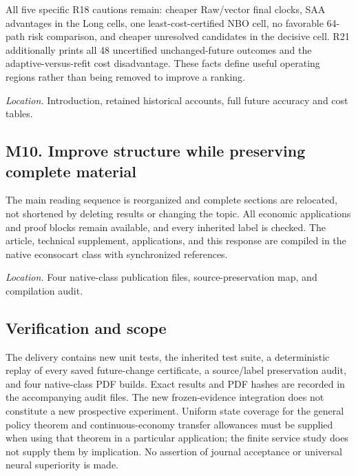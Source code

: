 \documentclass[ecta,nameyear,draft]{econsocart}
\theoremstyle{definition}
\theoremstyle{remark}
\begin{document}
All five specific R18 cautions remain: cheaper Raw/vector final clocks, SAA advantages in the Long cells, one least-cost-certified NBO cell, no favorable 64-path risk comparison, and cheaper unresolved candidates in the decisive cell. R21 additionally prints all 48 uncertified unchanged-future outcomes and the adaptive-versus-refit cost disadvantage. These facts define useful operating regions rather than being removed to improve a ranking.


\par\smallskip\noindent\emph{Location.} Introduction, retained historical accounts, full future accuracy and cost tables.

\subsection*{M10. Improve structure while preserving complete material}

The main reading sequence is reorganized and complete sections are relocated, not shortened by deleting results or changing the topic. All economic applications and proof blocks remain available, and every inherited label is checked. The article, technical supplement, applications, and this response are compiled in the native econsocart class with synchronized references.


\par\smallskip\noindent\emph{Location.} Four native-class publication files, source-preservation map, and compilation audit.

\subsection*{Verification and scope}

The delivery contains new unit tests, the inherited test suite, a deterministic replay of every saved future-change certificate, a source/label preservation audit, and four native-class PDF builds. Exact results and PDF hashes are recorded in the accompanying audit files. The new frozen-evidence integration does not constitute a new prospective experiment. Uniform state coverage for the general policy theorem and continuous-economy transfer allowances must be supplied when using that theorem in a particular application; the finite service study does not supply them by implication. No assertion of journal acceptance or universal neural superiority is made.
\end{document}

